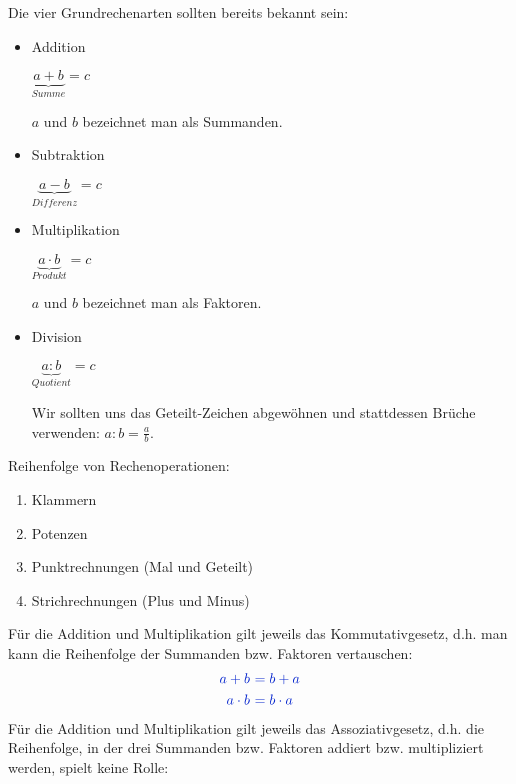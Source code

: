 Die vier Grundrechenarten sollten bereits bekannt sein:
\begin{tcolorbox}
	\begin{itemize}
		\item Addition

		\textcolor{loestc}{\(\underbrace{a+b}_{Summe}=c\)}

        \textcolor{loestc}{\(a\) und \(b\) bezeichnet man als Summanden.}

		\item Subtraktion

		\textcolor{loestc}{\(\underbrace{a-b}_{Differenz}=c\)}

		\item Multiplikation

		\textcolor{loestc}{\(\underbrace{a\cdot b}_{Produkt}=c\)}

        \textcolor{loestc}{\(a\) und \(b\) bezeichnet man als Faktoren.}

		\item Division

		\textcolor{loestc}{\(\underbrace{a:b}_{Quotient}=c\)}

        \textcolor{loestc}{Wir sollten uns das Geteilt-Zeichen abgewöhnen und stattdessen Brüche verwenden: \(a:b=\frac{a}{b}\).}
	\end{itemize}
\end{tcolorbox}
Reihenfolge von Rechenoperationen:
\begin{enumerate}
	\item \textcolor{loes}{Klammern}
	\item \textcolor{loes}{Potenzen}
	\item \textcolor{loes}{Punktrechnungen (Mal und Geteilt)}
	\item \textcolor{loes}{Strichrechnungen (Plus und Minus)}
\end{enumerate}
Für die Addition und Multiplikation gilt jeweils das Kommutativgesetz, d.h. man kann die Reihenfolge der Summanden bzw. Faktoren vertauschen:
\begin{align*}
	\textcolor{loes}{a+b\ }&\textcolor{loes}{=b+a}\\
	\textcolor{loes}{a\cdot b\ }&\textcolor{loes}{=b\cdot a}
\end{align*}
Für die Addition und Multiplikation gilt jeweils das Assoziativgesetz, d.h. die Reihenfolge, in der drei Summanden bzw. Faktoren addiert bzw. multipliziert werden, spielt keine Rolle:
